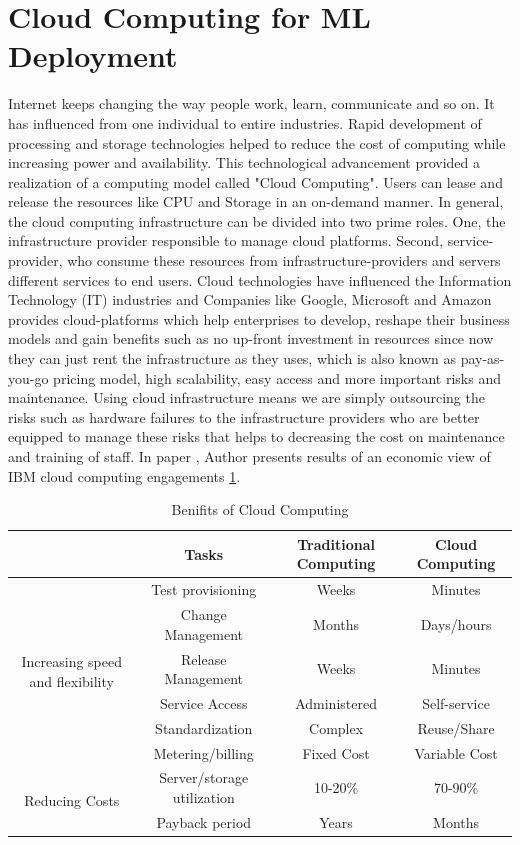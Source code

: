 \section{Cloud Computing for ML Deployment}

Internet keeps changing the way people work, learn, communicate and so on. It has influenced from one individual to entire industries. Rapid development of processing and storage technologies helped to reduce the cost of computing while increasing power and availability. This technological advancement provided a realization of a computing model called "Cloud Computing". Users can lease and release the resources like CPU and Storage in an on-demand manner. In general, the cloud computing infrastructure can be divided into two prime roles. One, the infrastructure provider responsible to manage cloud platforms. Second, service-provider, who consume these resources from infrastructure-providers and servers different services to end users. Cloud technologies have influenced the Information Technology (IT) industries and Companies like Google, Microsoft and Amazon provides cloud-platforms which help enterprises to develop, reshape their business models and gain benefits such as no up-front investment in resources since now they can just rent the infrastructure as they uses, which is also known as pay-as-you-go pricing model, high scalability, easy access and more important risks and maintenance. Using cloud infrastructure means we are simply outsourcing the risks such as hardware failures to the infrastructure providers who are better equipped to manage these risks that helps to decreasing the cost on maintenance and training of staff. In paper \cite{lee2013view}, Author presents results of an economic view of IBM cloud computing engagements \ref{tab:IT_benifits}.


\begin{table}[hb]
    \centering
    \begin{tabular}{|c|c|c|c|}
    \hline
         & Tasks & Traditional Computing &  Cloud Computing \\
    \hline
    \multirow{6}{5em}{Increasing speed and flexibility} & Test provisioning & Weeks & Minutes \\ 
        & Change Management & Months & Days/hours \\ 
        & Release Management & Weeks & Minutes \\
        & Service Access & Administered & Self-service \\ 
        & Standardization & Complex & Reuse/Share \\
        & Metering/billing & Fixed Cost & Variable Cost \\
    \hline
    \multirow{2}{5em}{Reducing Costs} & Server/storage utilization & 10-20\% & 70-90\% \\
        & Payback period & Years & Months \\
    \hline
    \end{tabular}
    \caption{Benifits of Cloud Computing}
    \label{tab:IT_benifits}
\end{table}



